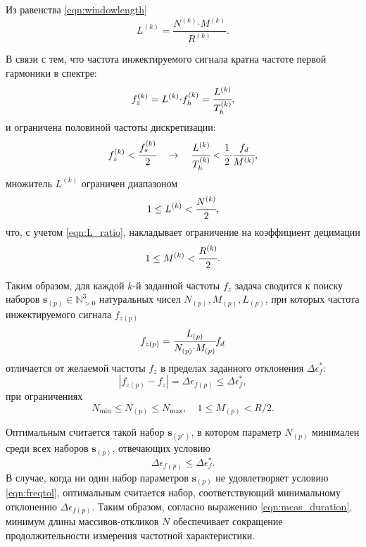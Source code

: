 Из равенства \eqref{eqn:windowlength}
\begin{equation}\label{eqn:L_ratio}
    L^{(k)} = \frac{N^{(k)} \mathord{\cdot} M^{(k)}}{R^{(k)}}.
\end{equation}

В связи с тем, что частота инжектируемого сигнала кратна частоте первой гармоники в спектре:
\begin{equation*}
    f^{(k)}_z = L^{(k)} \mathord{\cdot} f^{(k)}_h = \cfrac{L^{(k)}}{T^{(k)}_h},
\end{equation*}
и ограничена половиной частоты дискретизации:
\begin{equation*}
    f^{(k)}_z < \cfrac{f^{(k)}_s}{2} \quad \rightarrow \quad \cfrac{L^{(k)}}{T^{(k)}_h} <  \cfrac{1}{2} \mathord{\cdot} \cfrac{f_d}{M^{(k)}},
\end{equation*}
множитель ${L^{(k)}}$ ограничен диапазоном
\begin{equation*}
    1 \leq L^{(k)} < \cfrac{N^{(k)}}{2},
\end{equation*}
что, с учетом \eqref{eqn:L_ratio}, накладывает ограничение на коэффициент децимации
\begin{equation*}
    1 \leq M^{(k)} < \cfrac{R^{(k)}}{2}.
\end{equation*}

Таким образом, для каждой $k$-й заданной частоты ${f_z}$ задача сводится к поиску наборов ${\mathbf{s}_{(p)} \in \mathbb{N}_{> 0}^3}$ натуральных чисел ${N_{(p)}, M_{(p)}, L_{(p)}}$, при которых частота инжектируемого сигнала ${f_{z(p)}}$
\begin{equation*}
    f_{z(p)} = \cfrac{L_{(p)}}{N_{(p)} \mathord{\cdot} M_{(p)}} f_d
\end{equation*}
отличается от желаемой частоты ${f_z}$ в пределах заданного отклонения ${\Delta\epsilon^{*}_{f}}$:
\begin{equation*}
    \left| f_{z(p)} - f_z \right| = \Delta\epsilon_{f(p)} \leq \Delta\epsilon^{*}_f,
\end{equation*}
при ограничениях
\begin{equation*}
        N_\text{min} \leq N_{(p)} \leq N_\text{max}, \quad 1 \leq M_{(p)} < R/2.
\end{equation*}

Оптимальным считается такой набор ${\mathbf{s}_{(p^{*})}}$, в котором параметр ${N_{(p)}}$ минимален среди всех наборов ${\mathbf{s}_{(p)}}$, отвечающих условию
\begin{equation}\label{eqn:freqtol}
    \Delta\epsilon_{f(p)} \leq \Delta\epsilon^{*}_{f}.
\end{equation}
В случае, когда ни один набор параметров ${\mathbf{s}_{(p)}}$ не удовлетворяет условию \eqref{eqn:freqtol}, оптимальным считается набор, соответствующий минимальному отклонению ${\Delta\epsilon_{f(p)}}$. Таким образом, согласно выражению \eqref{eqn:meas_duration}, минимум длины массивов-откликов $N$ обеспечивает сокращение продолжительности измерения частотной характеристики.